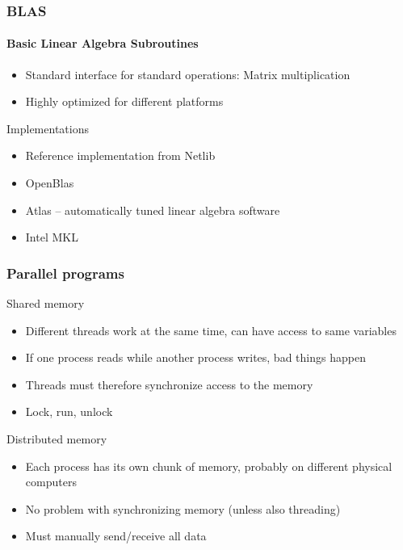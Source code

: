 \documentclass[usenames,dvipsnames,mathserif,compress]{beamer}
\begin{document}
\begin{frame}
  \frametitle{BLAS}
  \framesubtitle{Basic Linear Algebra Subroutines}
  \begin{itemize}
  \item Standard interface for standard operations:
    Matrix multiplication
  \item Highly optimized for different platforms
  \end{itemize}
  \begin{block}{Implementations}
    \begin{itemize}
    \item Reference implementation from Netlib
    \item OpenBlas
    \item Atlas -- automatically tuned linear algebra software
    \item Intel MKL
    \end{itemize}
  \end{block}
\end{frame}


\begin{frame}
  \frametitle{Parallel programs}
  \begin{block}{Shared memory}
    \begin{itemize}
    \item Different threads work at the same time, can have access to same variables
    \item If one process reads while another process writes, bad things happen
    \item Threads must therefore synchronize access to the memory
    \item Lock, run, unlock
    \end{itemize}
  \end{block}
  \begin{block}{Distributed memory}
    \begin{itemize}
    \item Each process has its own chunk of memory, probably on different physical computers
    \item No problem with synchronizing memory (unless also threading)
    \item Must manually send/receive all data
    \end{itemize}
  \end{block}
\end{frame}
\end{document}
